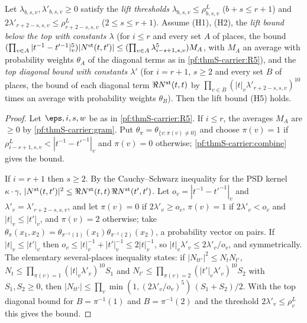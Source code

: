 \begin{lemma}\label{pf:thmS-carrier:liftplaces}
Let $\lambda_{b,s,v},\lambda'_{b,s,v}\ge0$ satisfy the \emph{lift thresholds} $\lambda_{b,s,v}\le\rho^L_{b,s,v}$ ($b+s\le
r+1$) and $2\lambda'_{r+2-s,s,v}\le\rho^L_{r+2-s,s,v}$ ($2\le s\le r+1$). Assume (H1), (H2), the \emph{lift bound below the
top with constants $\lambda$} (for $i\le r$ and every set $A$ of places, the bound
$(\prod_{v\in A}|t^{-1}-t'^{-1}|_v^5)|N^{\mathrm{st}}(t,t')|\le(\prod_{v\in A}\lambda_{i-s+1,s,v}^5)M_A$, with $M_A$ an
average with probability weights $\theta_A$ of the diagonal terms as in \ref{pf:thmS-carrier:R5}), and the \emph{top diagonal
bound with constants $\lambda'$} (for $i=r+1$, $s\ge2$ and every set $B$ of places, the bound of each diagonal term
$\Re N^{\mathrm{st}}(t,t)$ by $\prod_{v\in B}(|t|_v\lambda'_{r+2-s,s,v})^{10}$ times an average with probability weights
$\theta_B$). Then the lift bound (H5) holds.
\end{lemma}

\begin{proof}
Let $\eps,i,s,w$ be as in \ref{pf:thmS-carrier:R5}. If $i\le r$, the averages $M_A$ are $\ge0$ by \cref{pf:thmS-carrier:gram}.
Put $\theta_\pi=\theta_{\{v:\pi(v)\ne0\}}$ and choose $\pi(v)=1$ if $\rho^L_{i-s+1,s,v}<|t^{-1}-t'^{-1}|_v$ and $\pi(v)=0$
otherwise; \cref{pf:thmS-carrier:combine} gives the bound.

If $i=r+1$ then $s\ge2$. By the Cauchy--Schwarz inequality for the PSD kernel $\kappa\cdot\gamma$,
$|N^{\mathrm{st}}(t,t')|^2\le\Re N^{\mathrm{st}}(t,t)\,\Re N^{\mathrm{st}}(t',t')$. Let $o_v=|t^{-1}-t'^{-1}|_v$ and
$\lambda'_v=\lambda'_{r+2-s,s,v}$, and let $\pi(v)=0$ if $2\lambda'_v\ge o_v$, $\pi(v)=1$ if $2\lambda'_v<o_v$ and
$|t|_v\le|t'|_v$, and $\pi(v)=2$ otherwise; take $\theta_\pi(x_1,x_2)=\theta_{\pi^{-1}(1)}(x_1)\theta_{\pi^{-1}(2)}(x_2)$, a
probability vector on pairs. If $|t|_v\le|t'|_v$ then $o_v\le|t|_v^{-1}+|t'|_v^{-1}\le2|t|_v^{-1}$, so
$|t|_v\lambda'_v\le2\lambda'_v/o_v$, and symmetrically. The elementary several-places inequality
 states: if $|N_{tt'}|^2\le N_tN_{t'}$,
$N_t\le\prod_{\pi(v)=1}(|t|_v\lambda'_v)^{10}S_1$ and $N_{t'}\le\prod_{\pi(v)=2}(|t'|_v\lambda'_v)^{10}S_2$ with
$S_1,S_2\ge0$, then $|N_{tt'}|\le\prod_v\min(1,(2\lambda'_v/o_v)^5)\,(S_1+S_2)/2$. With the top diagonal bound for
$B=\pi^{-1}(1)$ and $B=\pi^{-1}(2)$ and the threshold $2\lambda'_v\le\rho^L_v$ this gives the bound.
\end{proof}

